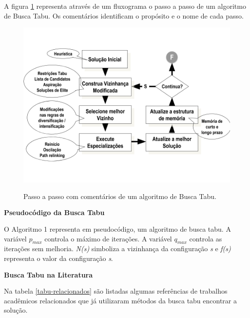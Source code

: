 

A figura \ref{taboo-image} representa através de um fluxograma o passo a passo de um algoritmo de Busca Tabu. Os comentários identificam o propósito e o nome de cada passo. 


\begin{figure}[H]
  \centering
  \caption{Passo a passo com comentários de um algoritmo de Busca Tabu.}
 \includegraphics[scale=0.4]{imagens/tabu.png} \par
\bigskip
    \cite[p. 97]{goldbarg}
    \label{taboo-image}
\end{figure}


\textbf{Pseudocódigo da Busca Tabu} \par

O Algoritmo 1 representa em pseudocódigo, um algoritmo de busca tabu. A variável $p_{max}$ controla o máximo de iterações. A variável $q_{max}$ controla as iterações sem melhoria. \emph{N(s)} simboliza a vizinhança da configuração \emph{s} e \emph{f(s)} representa o valor da configuração \emph{s}.



\textbf{Busca Tabu na Literatura} \par
Na tabela \ref{tabu-relacionados} são listadas algumas referências de trabalhos acadêmicos relacionados que já utilizaram métodos da busca tabu encontrar a solução.

